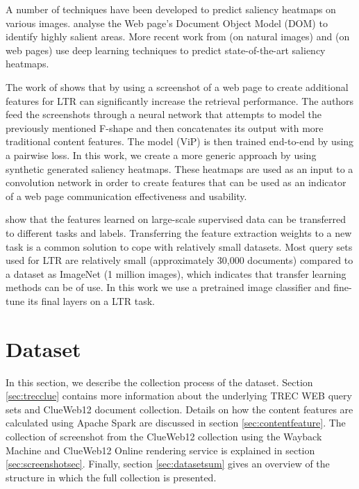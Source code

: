 A number of techniques have been developed to predict saliency heatmaps on various images. \citet{buscher2009you} analyse the Web page's Document Object Model (DOM) to identify highly salient areas. More recent work from \citet{kummerer2016deepgaze} (on natural images) and \citet{shan2017two} (on web pages) use deep learning techniques to predict state-of-the-art saliency heatmaps. 

The work of \citet{fan2017learning} shows that by using a screenshot of a web page to create additional features for LTR can significantly increase the retrieval performance. The authors feed the screenshots through a neural network that attempts to model the previously mentioned F-shape and then concatenates its output with more traditional content features. The model (ViP) is then trained end-to-end by using a pairwise loss. In this work, we create a more generic approach by using synthetic generated saliency heatmaps. These heatmaps are used as an input to a convolution network in order to create features that can be used as an indicator of a web page communication effectiveness and usability. 

\citet{donahue2014decaf} show that the features learned on large-scale supervised data can be transferred to different tasks and labels. Transferring the feature extraction weights to a new task is a common solution to cope with relatively small datasets. Most query sets used for LTR are relatively small (approximately 30,000 documents) compared to a dataset as ImageNet (1 million images), which indicates that transfer learning methods can be of use. In this work we use a pretrained image classifier and fine-tune its final layers on a LTR task. 



\section{Dataset}\label{sec:dataset}
In this section, we describe the collection process of the \datasetname dataset. Section \ref{sec:trecclue} contains more information about the underlying TREC WEB query sets and ClueWeb12 document collection. Details on how the content features are calculated using Apache Spark are discussed in section \ref{sec:contentfeature}. The collection of screenshot from the ClueWeb12 collection using the Wayback Machine and ClueWeb12 Online rendering service is explained in section \ref{sec:screenshotsec}. Finally, section \ref{sec:datasetsum} gives an overview of the structure in which the full collection is presented.

